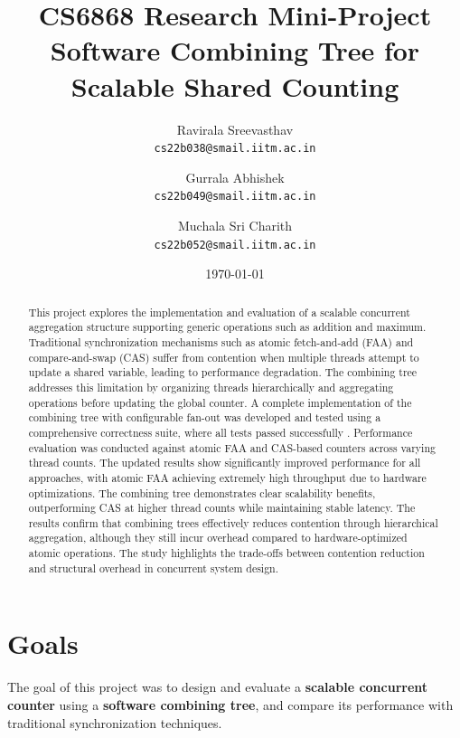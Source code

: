 \documentclass[11pt,a4paper]{article}
\title{%
  \textbf{CS6868 Research Mini-Project} \\[0.3em]
  \Large Software Combining Tree for Scalable Shared Counting%
}
\author{%
  Ravirala Sreevasthav \\ \texttt{cs22b038@smail.iitm.ac.in}
  \and
  Gurrala Abhishek \\ \texttt{cs22b049@smail.iitm.ac.in}
  \and
  Muchala Sri Charith \\ \texttt{cs22b052@smail.iitm.ac.in}
}
\date{\today}
\begin{document}
\maketitle

\begin{abstract}
This project explores the implementation and evaluation of a scalable concurrent aggregation structure supporting generic operations such as addition and maximum. Traditional synchronization mechanisms such as atomic fetch-and-add (FAA) and compare-and-swap (CAS) suffer from contention when multiple threads attempt to update a shared variable, leading to performance degradation. The combining tree addresses this limitation by organizing threads hierarchically and aggregating operations before updating the global counter.
A complete implementation of the combining tree with configurable fan-out was developed and tested using a comprehensive correctness suite, where all tests passed successfully . Performance evaluation was conducted against atomic FAA and CAS-based counters across varying thread counts. The updated results show significantly improved performance for all approaches, with atomic FAA achieving extremely high throughput due to hardware optimizations. The combining tree demonstrates clear scalability benefits, outperforming CAS at higher thread counts while maintaining stable latency.
The results confirm that combining trees effectively reduces contention through hierarchical aggregation, although they still incur overhead compared to hardware-optimized atomic operations. The study highlights the trade-offs between contention reduction and structural overhead in concurrent system design.
\end{abstract}

\section{Goals}
\label{sec:goals}

The goal of this project was to design and evaluate a \textbf{scalable concurrent counter} using a \textbf{software combining tree}, and compare its performance with traditional synchronization techniques.
\end{document}
